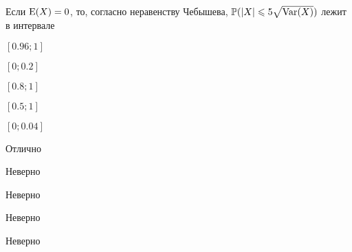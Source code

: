 
\begin{question}
Если \(\operatorname{E}(X)=0\), то, согласно неравенству Чебышева,
\(\mathbb{P}(|X| \leqslant 5 \sqrt{\operatorname{Var}(X)})\) лежит в интервале
\begin{answerlist}
  \item \([0.96;1]\)
  \item \([0;0.2]\)
  \item \([0.8;1]\)
  \item \([0.5;1]\)
  \item \([0;0.04]\)
\end{answerlist}
\end{question}

\begin{solution}
\begin{answerlist}
  \item Отлично
  \item Неверно
  \item Неверно
  \item Неверно
  \item Неверно
\end{answerlist}
\end{solution}

